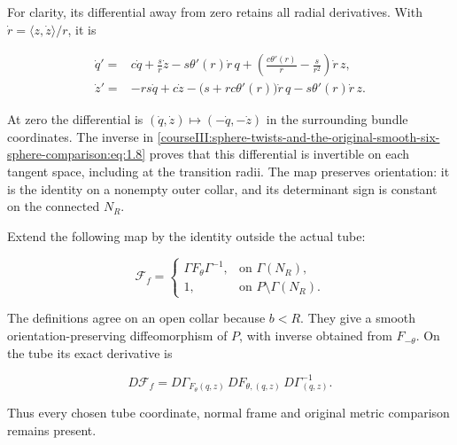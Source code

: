 For clarity, its differential away from zero retains all radial derivatives. With \(\dot r=\langle z,\dot z\rangle/r\), it is

\begin{equation}
\begin{split}
 \dot q'={}&c\dot q+\frac{s}{r}\dot z
       -s\theta'(r)\dot r\,q
       +\left(\frac{c\theta'(r)}r-\frac{s}{r^2}\right)\dot r\,z,\\
 \dot z'={}&-rs\dot q+c\dot z
       -\bigl(s+rc\theta'(r)\bigr)\dot r\,q
       -s\theta'(r)\dot r\,z .
 \end{split}
 \label{courseIII:sphere-twists-and-the-original-smooth-six-sphere-comparison:eq:1.9}
\end{equation}

At zero the differential is \((\dot q,\dot z)\mapsto(-\dot q,-\dot z)\) in the surrounding bundle coordinates. The inverse in \eqref{courseIII:sphere-twists-and-the-original-smooth-six-sphere-comparison:eq:1.8} proves that this differential is invertible on each tangent space, including at the transition radii. The map preserves orientation: it is the identity on a nonempty outer collar, and its determinant sign is constant on the connected \(N_R\).

Extend the following map by the identity outside the actual tube:

\begin{equation}
\mathcal F_f=
 \begin{cases}
  \Gamma F_\theta\Gamma^{-1},&\text{on }\Gamma(N_R),\\
  1,&\text{on }P\setminus\Gamma(N_R).
 \end{cases}
 \label{courseIII:sphere-twists-and-the-original-smooth-six-sphere-comparison:eq:1.10}
\end{equation}

The definitions agree on an open collar because \(b<R\). They give a smooth orientation-preserving diffeomorphism of \(P\), with inverse obtained from \(F_{-\theta}\). On the tube its exact derivative is

\begin{equation}
D\mathcal F_f
       =D\Gamma_{F_\theta(q,z)}\,
             DF_{\theta,(q,z)}\,D\Gamma_{(q,z)}^{-1}.
 \label{courseIII:sphere-twists-and-the-original-smooth-six-sphere-comparison:eq:1.11}
\end{equation}

Thus every chosen tube coordinate, normal frame and original metric comparison remains present.

